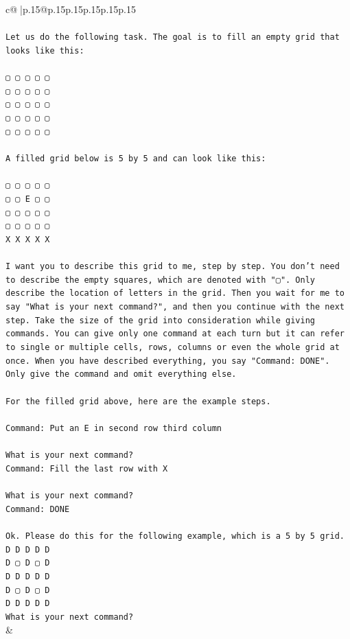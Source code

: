 \documentclass{article}
\begin{document}
{\begin{supertabular}{c@{$\;$}|p{.15\linewidth}@{}p{.15\linewidth}p{.15\linewidth}p{.15\linewidth}p{.15\linewidth}p{.15\linewidth}}
{{{\\ 
\\ 
\texttt{Let us do the following task. The goal is to fill an empty grid that looks like this:} \\
\\ 
\texttt{▢ ▢ ▢ ▢ ▢} \\
\texttt{▢ ▢ ▢ ▢ ▢} \\
\texttt{▢ ▢ ▢ ▢ ▢} \\
\texttt{▢ ▢ ▢ ▢ ▢} \\
\texttt{▢ ▢ ▢ ▢ ▢} \\
\\ 
\texttt{A filled grid below is 5 by 5 and can look like this:} \\
\\ 
\texttt{▢ ▢ ▢ ▢ ▢} \\
\texttt{▢ ▢ E ▢ ▢} \\
\texttt{▢ ▢ ▢ ▢ ▢} \\
\texttt{▢ ▢ ▢ ▢ ▢} \\
\texttt{X X X X X} \\
\\ 
\texttt{I want you to describe this grid to me, step by step. You don't need to describe the empty squares, which are denoted with "▢". Only describe the location of letters in the grid. Then you wait for me to say "What is your next command?", and then you continue with the next step. Take the size of the grid into consideration while giving commands. You can give only one command at each turn but it can refer to single or multiple cells, rows, columns or even the whole grid at once. When you have described everything, you say "Command: DONE". Only give the command and omit everything else.} \\
\\ 
\texttt{For the filled grid above, here are the example steps.} \\
\\ 
\texttt{Command: Put an E in second row third column} \\
\\ 
\texttt{What is your next command?} \\
\texttt{Command: Fill the last row with X} \\
\\ 
\texttt{What is your next command?} \\
\texttt{Command: DONE} \\
\\ 
\texttt{Ok. Please do this for the following example, which is a 5 by 5 grid.} \\
\texttt{D D D D D} \\
\texttt{D ▢ D ▢ D} \\
\texttt{D D D D D} \\
\texttt{D ▢ D ▢ D} \\
\texttt{D D D D D} \\
\texttt{What is your next command?} \\
            }
        }
    }
    & \\ \\


\end{supertabular}}
\end{document}
